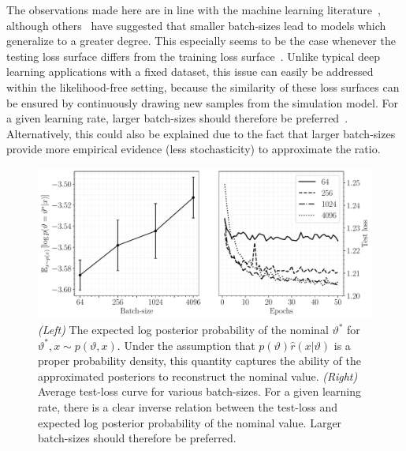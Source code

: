 \documentclass[fleqn,usenatbib]{mnras}
\begin{document}
The observations made here are in line with
the machine learning literature~\citep{hoffer2017train},
although others~\citep{keskar2016large,masters2018revisiting} have suggested that smaller batch-sizes
lead to models which generalize to a greater degree. This especially seems to be the case
whenever the testing loss surface differs from the training loss surface~\citep{keskar2016large}.
Unlike typical deep learning applications with a fixed dataset,
this issue can easily be addressed within the likelihood-free setting, because
the similarity of these loss surfaces can be ensured by continuously drawing new samples from
the simulation model. For a given learning rate, larger batch-sizes should therefore be preferred~\citep{smith2017don}.
Alternatively, this could also be explained due to the fact that larger batch-sizes provide more empirical evidence (less stochasticity)
to approximate the ratio.
\begin{figure}
  \centering
  \includegraphics[width=\linewidth]{figures/batch-size-evaluation}
  \caption{\emph{(Left)} The expected log posterior probability of the nominal $\vartheta^*$ for $\vartheta^*,x\sim p(\vartheta,x)$. Under the assumption that $p(\vartheta)\hat{r}(x\vert\vartheta)$
  is a proper probability density, this quantity captures the ability of the approximated
  posteriors to reconstruct the nominal value.
  \emph{(Right)} Average test-loss curve for various batch-sizes. For a given learning rate,
  there is a clear inverse relation between the test-loss and expected log posterior probability of the nominal value. Larger batch-sizes should therefore be preferred.
    ~~\protect{}}
  \label{fig:batch_size_expectation_loss}
\end{figure}
\end{document}

